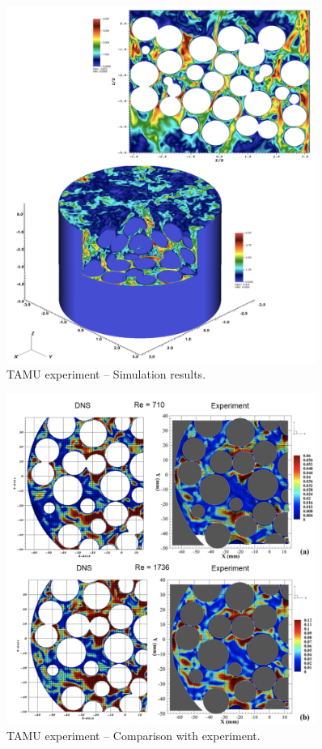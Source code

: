 \begin{figure}[!h]
\centering
\includegraphics[clip=true,width=0.9\textwidth]{Figures/pb_tamu3}
\caption{TAMU experiment -- Simulation results.}
\label{f:tamu3}
\end{figure}

\begin{figure}[!h]
\centering
\includegraphics[clip=true,width=0.9\textwidth]{Figures/pb_tamu4}
\caption{TAMU experiment -- Comparison with experiment. }
\label{f:tamu4}
\end{figure}

